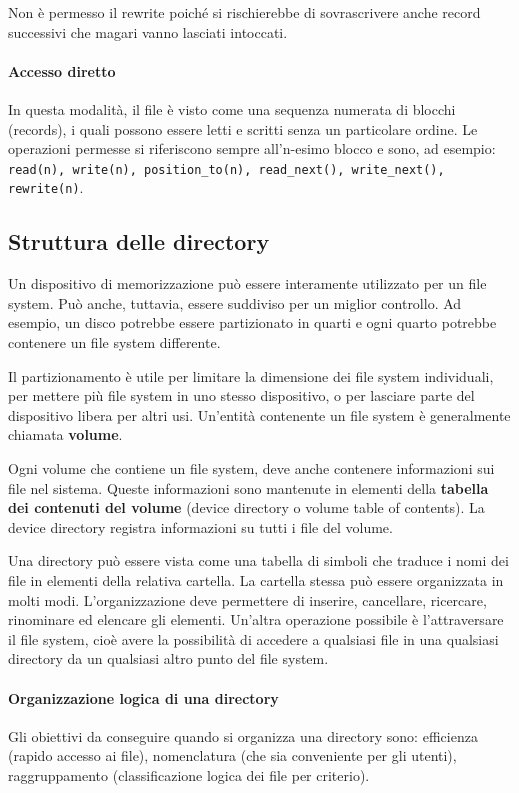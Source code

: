 \documentclass[a4paper]{article}
\begin{document}
Non è permesso il rewrite poiché si rischierebbe di sovrascrivere anche record successivi che magari vanno lasciati intoccati.

\paragraph{Accesso diretto}
In questa modalità, il file è visto come una sequenza numerata di blocchi (records), i quali possono essere letti e scritti senza un particolare ordine. Le operazioni permesse si riferiscono sempre all'n-esimo blocco e sono, ad esempio: \texttt{read(n), write(n), position\_to(n), read\_next(), write\_next(), rewrite(n)}.

\subsection{Struttura delle directory}
Un dispositivo di memorizzazione può essere interamente utilizzato per un file system. Può anche, tuttavia, essere suddiviso per un miglior controllo. Ad esempio, un disco potrebbe essere partizionato in quarti e ogni quarto potrebbe contenere un file system differente.

Il partizionamento è utile per limitare la dimensione dei file system individuali, per mettere più file system in uno stesso dispositivo, o per lasciare parte del dispositivo libera per altri usi. Un'entità contenente un file system è generalmente chiamata \textbf{volume}.

Ogni volume che contiene un file system, deve anche contenere informazioni sui file nel sistema. Queste informazioni sono mantenute in elementi della \textbf{tabella dei contenuti del volume} (device directory o volume table of contents). La device directory registra informazioni su tutti i file del volume.

Una directory può essere vista come una tabella di simboli che traduce i nomi dei file in elementi della relativa cartella. La cartella stessa può essere organizzata in molti modi. L'organizzazione deve permettere di inserire, cancellare, ricercare, rinominare ed elencare gli elementi. Un'altra operazione possibile è l'attraversare il file system, cioè avere la possibilità di accedere a qualsiasi file in una qualsiasi directory da un qualsiasi altro punto del file system.

\paragraph{Organizzazione logica di una directory}
Gli obiettivi da conseguire quando si organizza una directory sono: efficienza (rapido accesso ai file), nomenclatura (che sia conveniente per gli utenti), raggruppamento (classificazione logica dei file per criterio).
\newline
\end{document}
